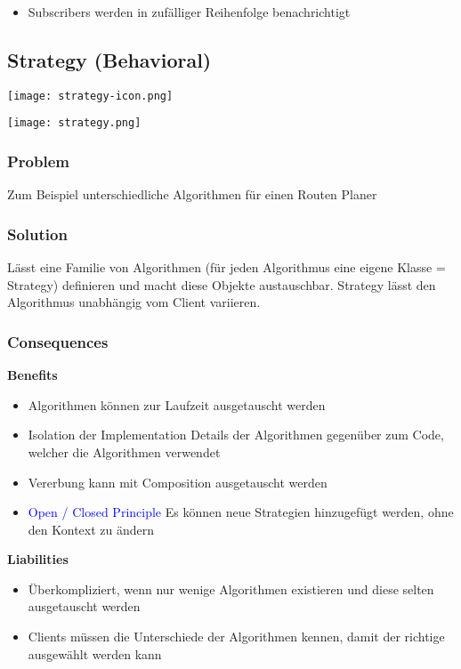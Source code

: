 \begin{itemize}
    \item Subscribers werden in zufälliger Reihenfolge benachrichtigt
\end{itemize}

\subsection{Strategy (Behavioral)}

\texttt{[image: strategy-icon.png]}

\texttt{[image: strategy.png]}

\subsubsection{Problem}

Zum Beispiel unterschiedliche Algorithmen für einen Routen Planer

\subsubsection{Solution}

Lässt eine Familie von Algorithmen (für jeden Algorithmus eine eigene Klasse = Strategy) definieren und macht diese Objekte austauschbar. Strategy lässt den Algorithmus unabhängig vom Client variieren.

\subsubsection{Consequences}

\textbf{Benefits}
\begin{itemize}
    \item Algorithmen können zur Laufzeit ausgetauscht werden
    \item Isolation der Implementation Details der Algorithmen gegenüber zum Code, welcher die Algorithmen verwendet
    \item Vererbung kann mit Composition ausgetauscht werden
    \item \textcolor{blue}{Open / Closed Principle} Es können neue Strategien hinzugefügt werden, ohne den Kontext zu
    ändern
\end{itemize}
\vspace{10pt}
\textbf{Liabilities}

\begin{itemize}
    \item Überkompliziert, wenn nur wenige Algorithmen existieren und diese selten ausgetauscht werden
    \item Clients müssen die Unterschiede der Algorithmen kennen, damit der richtige ausgewählt werden
    kann
\end{itemize}

